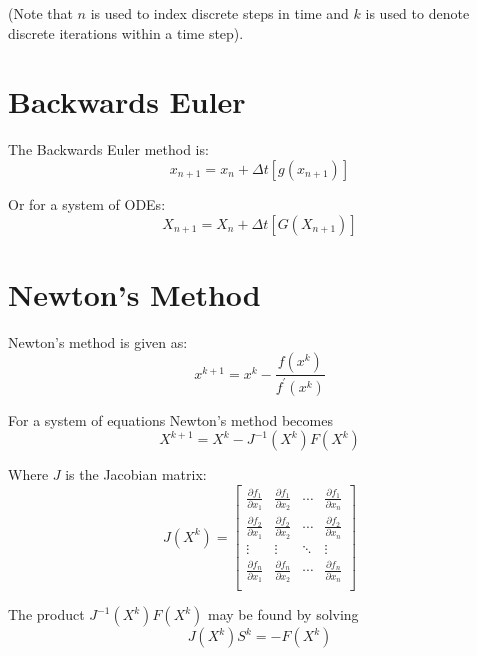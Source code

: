 \documentclass[11pt]{article}
\begin{document}
(Note that $n$ is used to index discrete steps in time and $k$ is used to denote discrete iterations within a time step).
\section{Backwards Euler}
The Backwards Euler method is:
\begin{equation}
  x_{n+1} = x_n + \Delta t \left[g\left(x_{n+1}\right)\right]
\end{equation}

Or for a system of ODEs:
\begin{equation}
  X_{n+1} = X_n + \Delta t \left[G\left(X_{n+1}\right)\right]
\end{equation}
\section{Newton's Method}
Newton's method is given as:
\begin{equation}
x^{k+1} = x^k - \frac{f(x^k)}{f^\prime(x^k)}
\end{equation}

For a system of equations Newton's method becomes
\begin{equation}
  X^{k+1} = X^k - J^{-1}(X^k) F(X^k)
\end{equation}

Where $J$ is the Jacobian matrix:
\begin{equation}
  J(X^k) =
  \begin{bmatrix}
    \frac{\partial f_1}{\partial x_1} & \frac{\partial f_1}{\partial x_2} & \cdots & \frac{\partial f_1}{\partial x_n}\\
    \frac{\partial f_2}{\partial x_1} & \frac{\partial f_2}{\partial x_2} & \cdots & \frac{\partial f_2}{\partial x_n} \\
    \vdots & \vdots & \ddots & \vdots \\
    \frac{\partial f_n}{\partial x_1} & \frac{\partial f_n}{\partial x_2} & \cdots & \frac{\partial f_n}{\partial x_n} \\
  \end{bmatrix}
\end{equation}

The product $J^{-1}(X^k) F(X^k)$ may be found by solving
\begin{equation}
  J(X^k) S^k = -F(X^k)
\end{equation}
\end{document}
